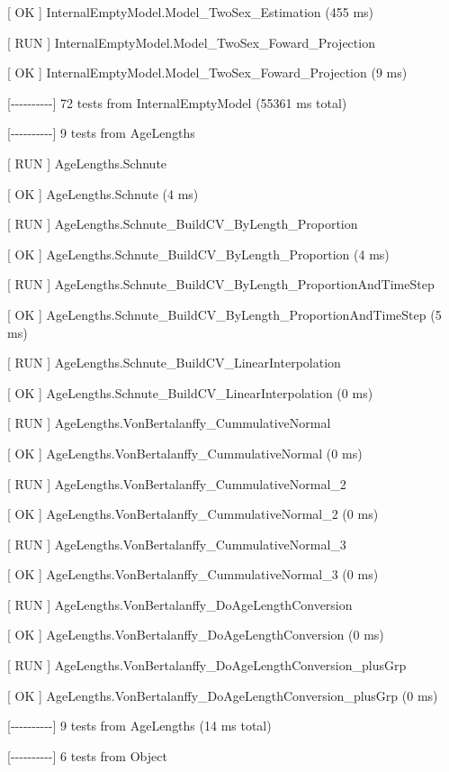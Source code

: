\documentclass[a4paper,11pt,twoside,pdftex,draft]{article}
\begin{document}
{[} OK {]} InternalEmptyModel.Model\_TwoSex\_Estimation (455 ms)

{[} RUN {]} InternalEmptyModel.Model\_TwoSex\_Foward\_Projection

{[} OK {]} InternalEmptyModel.Model\_TwoSex\_Foward\_Projection (9 ms)

{[}-\/-\/-\/-\/-\/-\/-\/-\/-\/-{]} 72 tests from InternalEmptyModel
(55361 ms total)

{[}-\/-\/-\/-\/-\/-\/-\/-\/-\/-{]} 9 tests from AgeLengths

{[} RUN {]} AgeLengths.Schnute

{[} OK {]} AgeLengths.Schnute (4 ms)

{[} RUN {]} AgeLengths.Schnute\_BuildCV\_ByLength\_Proportion

{[} OK {]} AgeLengths.Schnute\_BuildCV\_ByLength\_Proportion (4 ms)

{[} RUN {]} AgeLengths.Schnute\_BuildCV\_ByLength\_ProportionAndTimeStep

{[} OK {]} AgeLengths.Schnute\_BuildCV\_ByLength\_ProportionAndTimeStep
(5 ms)

{[} RUN {]} AgeLengths.Schnute\_BuildCV\_LinearInterpolation

{[} OK {]} AgeLengths.Schnute\_BuildCV\_LinearInterpolation (0 ms)

{[} RUN {]} AgeLengths.VonBertalanffy\_CummulativeNormal

{[} OK {]} AgeLengths.VonBertalanffy\_CummulativeNormal (0 ms)

{[} RUN {]} AgeLengths.VonBertalanffy\_CummulativeNormal\_2

{[} OK {]} AgeLengths.VonBertalanffy\_CummulativeNormal\_2 (0 ms)

{[} RUN {]} AgeLengths.VonBertalanffy\_CummulativeNormal\_3

{[} OK {]} AgeLengths.VonBertalanffy\_CummulativeNormal\_3 (0 ms)

{[} RUN {]} AgeLengths.VonBertalanffy\_DoAgeLengthConversion

{[} OK {]} AgeLengths.VonBertalanffy\_DoAgeLengthConversion (0 ms)

{[} RUN {]} AgeLengths.VonBertalanffy\_DoAgeLengthConversion\_plusGrp

{[} OK {]} AgeLengths.VonBertalanffy\_DoAgeLengthConversion\_plusGrp (0
ms)

{[}-\/-\/-\/-\/-\/-\/-\/-\/-\/-{]} 9 tests from AgeLengths (14 ms total)

{[}-\/-\/-\/-\/-\/-\/-\/-\/-\/-{]} 6 tests from Object
\end{document}
